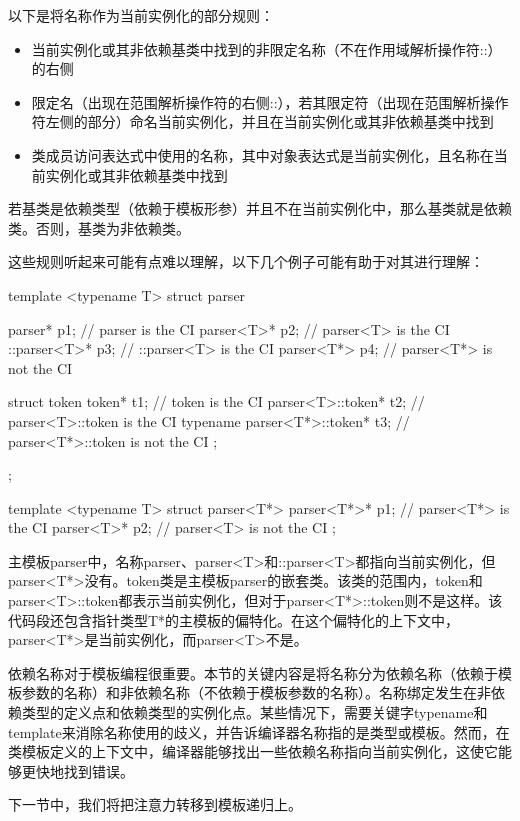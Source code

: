 以下是将名称作为当前实例化的部分规则：

\begin{itemize}
  \item 当前实例化或其非依赖基类中找到的非限定名称（不在作用域解析操作符::）的右侧
  \item 限定名（出现在范围解析操作符的右侧::），若其限定符（出现在范围解析操作符左侧的部分）命名当前实例化，并且在当前实例化或其非依赖基类中找到
  \item 类成员访问表达式中使用的名称，其中对象表达式是当前实例化，且名称在当前实例化或其非依赖基类中找到
\end{itemize}

\begin{note}
若基类是依赖类型（依赖于模板形参）并且不在当前实例化中，那么基类就是依赖类。否则，基类为非依赖类。
\end{note}

这些规则听起来可能有点难以理解，以下几个例子可能有助于对其进行理解：

\begin{cppcode}
template <typename T>
struct parser
{
	parser* p1; // parser is the CI
	parser<T>* p2; // parser<T> is the CI
	::parser<T>* p3; // ::parser<T> is the CI
	parser<T*> p4; // parser<T*> is not the CI

	struct token
	{
		token* t1; // token is the CI
		parser<T>::token* t2; // parser<T>::token is the CI
		typename parser<T*>::token* t3;
		// parser<T*>::token is not the CI
	};
};

template <typename T>
struct parser<T*>
{
	parser<T*>* p1; // parser<T*> is the CI
	parser<T>* p2; // parser<T> is not the CI
};
\end{cppcode}

主模板parser中，名称parser、parser<T>和::parser<T>都指向当前实例化，但parser<T*>没有。token类是主模板parser的嵌套类。该类的范围内，token和parser<T>::token都表示当前实例化，但对于parser<T*>::token则不是这样。该代码段还包含指针类型T*的主模板的偏特化。在这个偏特化的上下文中，parser<T*>是当前实例化，而parser<T>不是。

依赖名称对于模板编程很重要。本节的关键内容是将名称分为依赖名称（依赖于模板参数的名称）和非依赖名称（不依赖于模板参数的名称）。名称绑定发生在非依赖类型的定义点和依赖类型的实例化点。某些情况下，需要关键字typename和template来消除名称使用的歧义，并告诉编译器名称指的是类型或模板。然而，在类模板定义的上下文中，编译器能够找出一些依赖名称指向当前实例化，这使它能够更快地找到错误。

下一节中，我们将把注意力转移到模板递归上。























